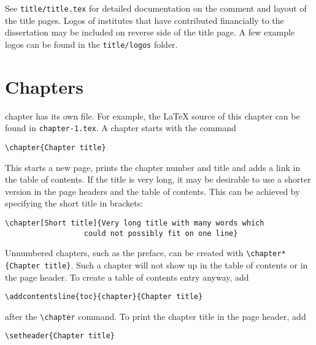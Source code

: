 See \texttt{title/title.tex} for detailed documentation on the comment and layout of the title pages. Logos of institutes that have contributed financially to the dissertation may be included on reverse side of the title page. A few example logos can be found in the \texttt{title/logos} folder.

\section{Chapters}

 chapter has its own file. For example, the \LaTeX{} source of this chapter can be found in \texttt{chapter-1.tex}. A chapter starts with the command

\begin{verbatim}
\chapter{Chapter title}
\end{verbatim}
This starts a new page, prints the chapter number and title and adds a link in the table of contents. If the title is very long, it may be desirable to use a shorter version in the page headers and the table of contents. This can be achieved by specifying the short title in brackets:

\begin{verbatim}
\chapter[Short title]{Very long title with many words which
                  could not possibly fit on one line}
\end{verbatim}
Unnumbered chapters, such as the preface, can be created with 
\verb|\chapter*{Chapter title}|. 
Such a chapter will not show up in the table of contents or in the page header. To create a table of contents entry anyway, add
\begin{verbatim}
\addcontentsline{toc}{chapter}{Chapter title}
\end{verbatim}
after the \verb|\chapter| command. 
To print the chapter title in the page header, add
\begin{verbatim}
\setheader{Chapter title}
\end{verbatim}

